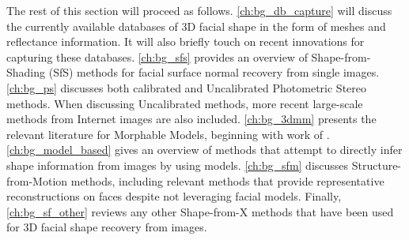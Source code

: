 The rest of this section will proceed as follows. \cref{ch:bg_db_capture} will
discuss the currently available databases of 3D facial shape in the form
of meshes and reflectance information. It will also briefly touch on recent
innovations for capturing these databases. \cref{ch:bg_sfs} provides an overview
of Shape-from-Shading (SfS) methods for facial surface normal recovery from
single images. \cref{ch:bg_ps} discusses both calibrated and 
Uncalibrated Photometric Stereo methods. When discussing Uncalibrated methods,
more recent large-scale methods from Internet images are also included. 
\cref{ch:bg_3dmm} presents the relevant literature for Morphable Models,
beginning with work of \citet{RefWorks:96}. \cref{ch:bg_model_based} gives an
overview of methods that attempt to directly infer shape information from images
by using models. \cref{ch:bg_sfm} discusses Structure-from-Motion methods,
including relevant methods that provide representative reconstructions
on faces despite not leveraging facial models. Finally, \cref{ch:bg_sf_other}
reviews any other Shape-from-X methods that have been used for 3D facial
shape recovery from images.







